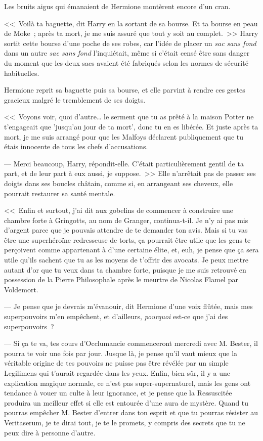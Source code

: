 Les bruits aigus qui émanaient de Hermione montèrent encore d'un cran.

<<~Voilà ta baguette, dit Harry en la sortant de sa bourse. Et ta bourse en peau de Moke~; après ta mort, je me suis assuré que tout y soit au complet.~>> Harry sortit cette bourse d'une poche de ses robes, car l'idée de placer un \emph{sac sans fond} dans un autre \emph{sac sans fond} l'inquiétait, même si c'était censé être sans danger du moment que les deux sacs avaient été fabriqués selon les normes de sécurité habituelles.

Hermione reprit sa baguette puis sa bourse, et elle parvint à rendre ces gestes gracieux malgré le tremblement de ses doigts.

<<~Voyons voir, quoi d'autre… le serment que tu as prêté à la maison Potter ne t'engageait que 'jusqu'au jour de ta mort', donc tu en es libérée. Et juste après ta mort, je me suis arrangé pour que les Malfoys déclarent publiquement que tu étais innocente de tous les chefs d'accusations.

--- Merci beaucoup, Harry, répondit-elle. C'était particulièrement gentil de ta part, et de leur part à eux aussi, je suppose.~>> Elle n'arrêtait pas de passer ses doigts dans ses boucles châtain, comme si, en arrangeant ses cheveux, elle pourrait restaurer sa santé mentale.

<<~Enfin et surtout, j'ai dit aux gobelins de commencer à construire une chambre forte à Gringotts, au nom de Granger, continua-t-il. Je n'y ai pas mis d'argent parce que je pouvais attendre de te demander ton avis. Mais si tu vas être une superhéroïne redresseuse de torts, ça pourrait être utile que les gens te perçoivent comme appartenant à d'une certaine élite, et, euh, je pense que ça sera utile qu'ils sachent que tu as les moyens de t'offrir des avocats. Je peux mettre autant d'or que tu veux dans ta chambre forte, puisque je me suis retrouvé en possession de la Pierre Philosophale après le meurtre de Nicolas Flamel par Voldemort.

--- Je pense que je devrais m'évanouir, dit Hermione d'une voix flûtée, mais mes superpouvoirs m'en empêchent, et d'ailleurs, \emph{pourquoi} est-ce que j'ai des superpouvoirs~?

--- Si ça te va, tes cours d'Occlumancie commenceront mercredi avec M. Bester, il pourra te voir une fois par jour. Jusque là, je pense qu'il vaut mieux que la véritable origine de tes pouvoirs ne puisse pas être révélée par un simple Legilimens qui t'aurait regardée dans les yeux. Enfin, bien sûr, il y a une explication magique normale, ce n'est pas super-supernaturel, mais les gens ont tendance à vouer un culte à leur ignorance, et je pense que la Ressuscitée produira un meilleur effet si elle est entourée d'une aura de mystère. Quand tu pourras empêcher M. Bester d'entrer dans ton esprit et que tu pourras résister au Veritaserum, je te dirai tout, je te le promets, y compris des secrets que tu ne peux dire à personne d'autre.

